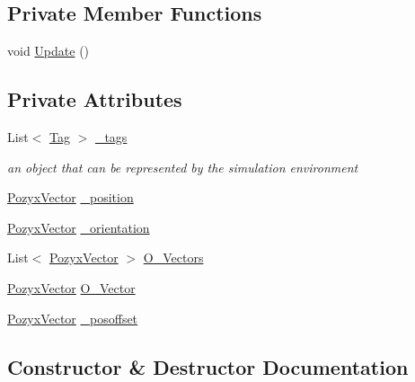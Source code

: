\subsection*{Private Member Functions}
\begin{DoxyCompactItemize}
\item 
void \hyperlink{class_pozyx_subscriber_1_1_framework_1_1_sim_object_a7e366950e0bdf28f37845e9f510a491f}{Update} ()
\end{DoxyCompactItemize}
\subsection*{Private Attributes}
\begin{DoxyCompactItemize}
\item 
List$<$ \hyperlink{class_pozyx_subscriber_1_1_framework_1_1_tag}{Tag} $>$ \hyperlink{class_pozyx_subscriber_1_1_framework_1_1_sim_object_ad8934fda7f02f6a3f2c86de8322b9204}{\+\_\+tags}
\begin{DoxyCompactList}\small\item\em an object that can be represented by the simulation environment \end{DoxyCompactList}\item 
\hyperlink{struct_pozyx_subscriber_1_1_framework_1_1_pozyx_vector}{Pozyx\+Vector} \hyperlink{class_pozyx_subscriber_1_1_framework_1_1_sim_object_a2ab2fcb731d1e194fb310ec9b33ccfaf}{\+\_\+position}
\item 
\hyperlink{struct_pozyx_subscriber_1_1_framework_1_1_pozyx_vector}{Pozyx\+Vector} \hyperlink{class_pozyx_subscriber_1_1_framework_1_1_sim_object_aab2f5dd433a5758bb747fd597f9e189c}{\+\_\+orientation}
\item 
List$<$ \hyperlink{struct_pozyx_subscriber_1_1_framework_1_1_pozyx_vector}{Pozyx\+Vector} $>$ \hyperlink{class_pozyx_subscriber_1_1_framework_1_1_sim_object_a544586c64fdd2d54247ebca86303ae1c}{O\+\_\+\+Vectors}
\item 
\hyperlink{struct_pozyx_subscriber_1_1_framework_1_1_pozyx_vector}{Pozyx\+Vector} \hyperlink{class_pozyx_subscriber_1_1_framework_1_1_sim_object_afd9bd7161a50f4a4f0a361bbba6f1f96}{O\+\_\+\+Vector}
\item 
\hyperlink{struct_pozyx_subscriber_1_1_framework_1_1_pozyx_vector}{Pozyx\+Vector} \hyperlink{class_pozyx_subscriber_1_1_framework_1_1_sim_object_a6809d1816519ed71734e2d21ef308222}{\+\_\+posoffset}
\end{DoxyCompactItemize}


\subsection{Constructor \& Destructor Documentation}
\mbox{\label{class_pozyx_subscriber_1_1_framework_1_1_sim_object_ab0a3cd312e9fdd62beea5f4dd5ecbd7f}} 
